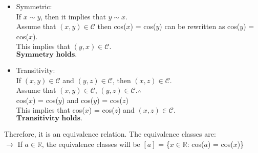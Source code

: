 \documentclass{article}
\newcommand{\R}{\mathbb{R}}
\begin{document}
\begin{enumerate}
\begin{enumerate}
\begin{itemize}
        \item Symmetric:\\If $x \sim y$, then it implies that $y \sim x$.\\Assume that $(x,y) \in 
        \mathcal{C}$ then cos($x$) = cos($y$) can be rewritten as cos($y$) = cos($x$).\\This implies 
        that $(y,x) \in \mathcal{C}$.\\$\textbf{Symmetry holds.}$\\ 

        \item Transitivity:\\If $(x,y) \in \mathcal{C}$ and $(y,z) \in \mathcal{C}$, then $(x,z) \in \mathcal{C}$.\\
        Assume that $(x,y) \in \mathcal{C}$, $(y,z) \in \mathcal{C}$.$\therefore$\\
        cos($x$) = cos($y$) and cos($y$) = cos($z$)\\
        This implies that cos($x$) = cos($z$) and $(x,z) \in \mathcal{C}$.\\$\textbf{Transitivity holds.}$\\
    \end{itemize}
    Therefore, it is an equivalence relation. The equivalence classes are:\\
    $\rightarrow$ If $a \in \R$, the equivalence classes will be $[a]$ = \{$x \in \R$: cos($a$) = cos($x$)\}\\


\end{enumerate}
\end{enumerate}
\end{document}
